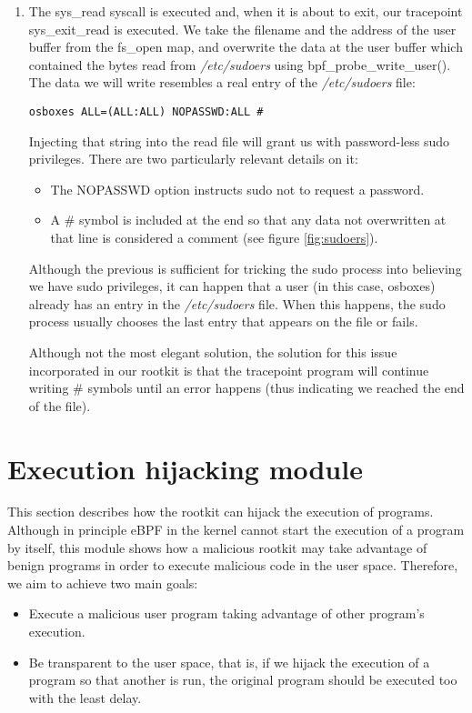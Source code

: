 \begin{enumerate}
\item The sys\_read syscall is executed and, when it is about to exit, our tracepoint sys\_exit\_read is executed. We take the filename and the address of the user buffer from the fs\_open map, and overwrite the data at the user buffer which contained the bytes read from \textit{/etc/sudoers} using bpf\_probe\_write\_user(). The data we will write resembles a real entry of the \textit{/etc/sudoers} file:
\begin{verbatim}
osboxes ALL=(ALL:ALL) NOPASSWD:ALL #
\end{verbatim}

Injecting that string into the read file will grant us with password-less sudo privileges. There are two particularly relevant details on it:
\begin{itemize}
\item The NOPASSWD option instructs sudo not to request a password.
\item A \# symbol is included at the end so that any data not overwritten at that line is considered a comment (see figure \ref{fig:sudoers}).
\end{itemize}

Although the previous is sufficient for tricking the sudo process into believing we have sudo privileges, it can happen that a user (in this case, osboxes) already has an entry in the \textit{/etc/sudoers} file. When this happens, the sudo process usually chooses the last entry that appears on the file or fails. 

Although not the most elegant solution, the solution for this issue incorporated in our rootkit is that the tracepoint program will continue writing \# symbols until an error happens (thus indicating we reached the end of the file).

\end{enumerate}


\section{Execution hijacking module} \label{section:execution_hijack}
This section describes how the rootkit can hijack the execution of programs. Although in principle eBPF in the kernel cannot start the execution of a program by itself, this module shows how a malicious rootkit may take advantage of benign programs in order to execute malicious code in the user space. Therefore, we aim to achieve two main goals:
\begin{itemize}
\item Execute a malicious user program taking advantage of other program's execution.
\item Be transparent to the user space, that is, if we hijack the execution of a program so that another is run, the original program should be executed too with the least delay.
\end{itemize}

